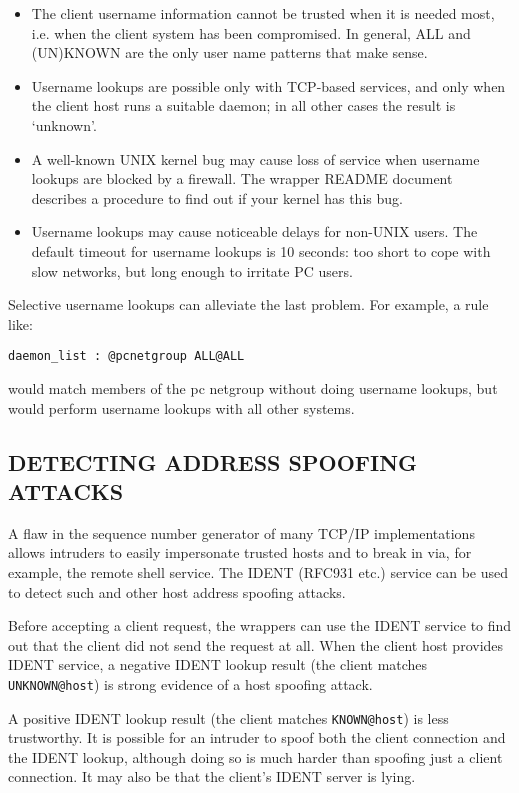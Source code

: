\documentclass[11pt,twoside,a4paper]{book}
\begin{document}
\begin{itemize}

\item The client username information cannot be trusted when it is
needed most, i.e. when the client system has been compromised.  In
general, ALL and (UN)KNOWN are the only user name patterns that make
sense.

\item Username lookups are possible only with TCP-based services, and
only when the client host runs a suitable daemon; in all other cases
the result is `unknown'.

\item A well-known UNIX kernel bug may cause loss of service when
username lookups are blocked by a firewall. The wrapper README
document describes a procedure to find out if your kernel has this
bug.

\item Username lookups may cause noticeable delays for non-UNIX users.
The default timeout for username lookups is 10 seconds: too short to
cope with slow networks, but long enough to irritate PC users.

\end{itemize}

Selective username lookups can alleviate the last problem. For
example, a rule like:

\texttt{daemon\_list : @pcnetgroup ALL@ALL }

would match members of the pc netgroup without doing username lookups,
but would perform username lookups with all other systems.

\subsection*{DETECTING ADDRESS SPOOFING ATTACKS}

A flaw in the sequence number generator of many TCP/IP implementations
allows intruders to easily impersonate trusted hosts and to break in
via, for example, the remote shell service.  The IDENT (RFC931 etc.)
service can be used to detect such and other host address spoofing
attacks.

Before accepting a client request, the wrappers can use the IDENT
service to find out that the client did not send the request at all.
When the client host provides IDENT service, a negative IDENT lookup
result (the client matches \texttt{UNKNOWN@host}) is strong evidence
of a host spoofing attack.

A positive IDENT lookup result (the client matches
\texttt{KNOWN@host}) is less trustworthy. It is possible for an
intruder to spoof both the client connection and the IDENT lookup,
although doing so is much harder than spoofing just a client
connection. It may also be that the client's IDENT server is lying.
\end{document}
